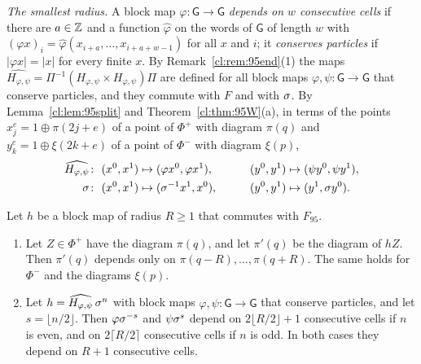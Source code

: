 \emph{The smallest radius.} A block map $\varphi\colon\mathsf G\to\mathsf G$ \emph{depends on $w$ consecutive cells} if there are $a\in\mathbb{Z}$ and a function $\hat\varphi$ on the words of $\mathsf G$ of length $w$ with $(\varphi x)_i=\hat\varphi(x_{i+a},\dots,x_{i+a+w-1})$ for all $x$ and $i$; it \emph{conserves particles} if $|\varphi x|=|x|$ for every finite $x$. By Remark~\ref{cl:rem:95end}(1) the maps $\widehat{H_{\varphi,\psi}}=\Pi^{-1}(H_{\varphi,\psi}\times H_{\varphi,\psi})\Pi$ are defined for all block maps $\varphi,\psi\colon\mathsf G\to\mathsf G$ that conserve particles, and they commute with $F$ and with $\sigma$. By Lemma~\ref{cl:lem:95split} and Theorem~\ref{cl:thm:95W}(a), in terms of the points $x^e_j=1\oplus\pi(2j+e)$ of a point of $\Phi^+$ with diagram $\pi(q)$ and $y^e_k=1\oplus\xi(2k+e)$ of a point of $\Phi^-$ with diagram $\xi(p)$,
\begin{equation}\label{cl:eq:95restr}
\begin{aligned}
\widehat{H_{\varphi,\psi}}&\colon\ (x^0,x^1)\mapsto(\varphi x^0,\varphi x^1),&\qquad(y^0,y^1)&\mapsto(\psi y^0,\psi y^1),\\
\sh&\colon\ (x^0,x^1)\mapsto(\sh^{-1}x^1,x^0),&\qquad(y^0,y^1)&\mapsto(y^1,\sh y^0).
\end{aligned}
\end{equation}

\begin{lemma}[windows]\label{cl:lem:95window}
Let $h$ be a block map of radius $R\ge1$ that commutes with $F_{95}$.
\begin{enumerate}
\item[(i)] Let $Z\in\Phi^+$ have the diagram $\pi(q)$, and let $\pi'(q)$ be the diagram of $hZ$. Then $\pi'(q)$ depends only on $\pi(q-R),\dots,\pi(q+R)$. The same holds for $\Phi^-$ and the diagrams $\xi(p)$.
\item[(ii)] Let $h=\widehat{H_{\varphi,\psi}}\,\sigma^n$ with block maps $\varphi,\psi\colon\mathsf G\to\mathsf G$ that conserve particles, and let $s=\lfloor n/2\rfloor$. Then $\varphi\sigma^{-s}$ and $\psi\sigma^{s}$ depend on $2\lfloor R/2\rfloor+1$ consecutive cells if $n$ is even, and on $2\lceil R/2\rceil$ consecutive cells if $n$ is odd. In both cases they depend on $R+1$ consecutive cells.
\end{enumerate}
\end{lemma}

